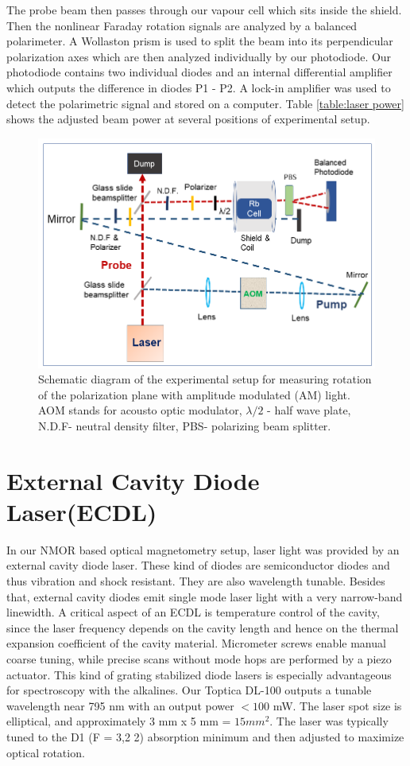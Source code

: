 The probe beam then passes through our vapour cell which sits inside the shield. Then the nonlinear Faraday rotation signals are analyzed by a balanced polarimeter.  A Wollaston prism is used to
split the beam into its perpendicular polarization axes which are then
analyzed individually by our photodiode. Our photodiode contains two
individual diodes and an internal differential amplifier which outputs the difference in diodes P1 - P2. A lock-in amplifier was used to detect the polarimetric signal and stored on a computer. Table \ref{table:laser power} shows the adjusted beam power at several positions of experimental setup.
\begin{figure}%
\centering
\includegraphics[width=0.95\linewidth]{figures/experimental_setup}
\caption{Schematic diagram of the experimental setup for measuring
  rotation of the polarization plane with amplitude modulated (AM)
  light. AOM stands for acousto optic modulator, $\lambda/2$ - half
  wave plate, N.D.F- neutral density filter, PBS- polarizing beam
  splitter.\label{fig:pumpprobe}}
\end{figure}
\section{External Cavity Diode Laser(ECDL)}
\bigskip
In our NMOR based optical magnetometry setup, laser light was provided by an external cavity diode laser. These kind of diodes are semiconductor diodes and thus vibration and shock resistant. They are also wavelength tunable. Besides that, external cavity diodes emit single mode laser light with a very narrow-band linewidth. A critical aspect of an ECDL is temperature control of the cavity, since the laser frequency depends on the cavity length and hence on the thermal expansion coefficient of the cavity material. Micrometer screws enable manual coarse tuning, while precise scans without mode hops are performed by a piezo actuator. This kind of grating stabilized diode lasers is especially advantageous for spectroscopy with the alkalines. Our Toptica DL-100 outputs a tunable wavelength near 795 nm with an output power $<100$ mW. The laser spot size is elliptical, and approximately 3 mm x 5 mm = $15 mm^2$.  The laser was typically tuned to the D1 (F = 3,2 2) absorption minimum and then adjusted to maximize optical rotation. 

